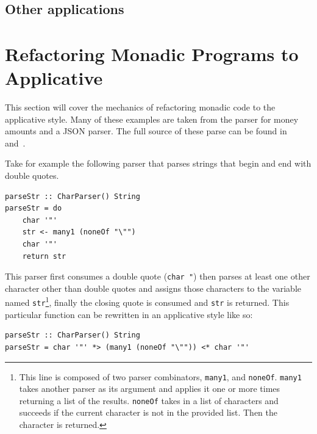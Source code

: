 \subsection{Other applications}
  

\section{Refactoring Monadic Programs to Applicative}
\label{sec:appRefact}
This section will cover the mechanics of refactoring monadic code to the applicative style. Many of these examples are taken from the parser for money amounts and a JSON parser. The full source of these parse can be found in~\cite{moneyParse} and~\cite{jsonParser}.

Take for example the following parser that parses strings that begin and end with double quotes.

\begin{lstlisting}[frame=tlrb]
parseStr :: CharParser() String
parseStr = do
	char '"'
	str <- many1 (noneOf "\"")
	char '"'
	return str
\end{lstlisting}

This parser first consumes a double quote (\texttt{char \textquotesingle"\textquotesingle}) then parses at least one other character other than double quotes and assigns those characters to the variable named \texttt{str}\footnote{This line is composed of two parser combinators, \texttt{many1}, and \texttt{noneOf}. \texttt{many1} takes another parser as its argument and applies it one or more times returning a list of the results. \texttt{noneOf} takes in a list of characters and succeeds if the current character is not in the provided list. Then the character is returned.}, finally the closing quote is consumed and \texttt{str} is returned. This particular function can be rewritten in an applicative style like so:

\begin{lstlisting}[frame=tlrb]
parseStr :: CharParser() String
parseStr = char '"' *> (many1 (noneOf "\"")) <* char '"'
\end{lstlisting}

